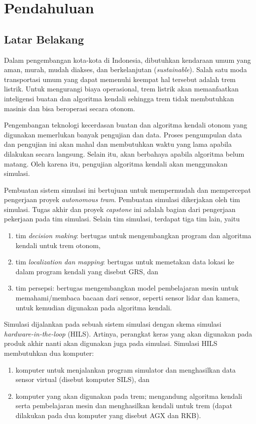 \chapter{Pendahuluan}\label{chapter-1}

\section{Latar Belakang}

Dalam pengembangan kota-kota di Indonesia, dibutuhkan kendaraan umum yang aman,
murah, mudah diakses, dan berkelanjutan (\textit{sustainable}). Salah satu moda
transportasi umum yang dapat memenuhi keempat hal tersebut adalah trem listrik.
Untuk mengurangi biaya operasional, trem listrik akan memanfaatkan inteligensi
buatan dan algoritma kendali sehingga trem tidak membutuhkan masinis dan bisa
beroperasi secara otonom.

Pengembangan teknologi kecerdasan buatan dan algoritma kendali otonom yang
digunakan memerlukan banyak pengujian dan data. Proses pengumpulan data dan
pengujian ini akan mahal dan membutuhkan waktu yang lama apabila dilakukan
secara langsung. Selain itu, akan berbahaya apabila algoritma belum matang. Oleh
karena itu, pengujian algoritma kendali akan menggunakan simulasi.

Pembuatan sistem simulasi ini bertujuan untuk mempermudah dan mempercepat
pengerjaan proyek \textit{autonomous tram}. Pembuatan simulasi dikerjakan oleh
tim simulasi. Tugas akhir dan proyek \textit{capstone} ini adalah bagian dari
pengerjaan pekerjaan pada tim simulasi. Selain tim simulasi, terdapat tiga tim
lain, yaitu
\begin{enumerate}
	\item tim \textit{decision making}: bertugas untuk mengembangkan program dan
	      algoritma kendali untuk trem otonom,
	\item tim \textit{localization dan mapping}: bertugas untuk memetakan data
	      lokasi ke dalam program kendali yang disebut GRS, dan
	\item tim persepsi: bertugas mengembangkan model pembelajaran mesin untuk
	      memahami/membaca bacaan dari sensor, seperti sensor lidar dan kamera,
	      untuk kemudian digunakan pada algoritma kendali.
\end{enumerate}

Simulasi dijalankan pada sebuah sistem simulasi dengan skema simulasi
\textit{hardware-in-the-loop} (HILS). Artinya, perangkat keras yang akan
digunakan pada produk akhir nanti akan digunakan juga pada simulasi. Simulasi
HILS membutuhkan dua komputer:
\begin{enumerate}
	\item komputer untuk menjalankan program simulator dan menghasilkan data
	      sensor virtual (disebut komputer SILS), dan
	\item komputer yang akan digunakan pada trem; mengandung algoritma
	      kendali serta pembelajaran mesin dan menghasilkan kendali untuk trem
	      (dapat dilakukan pada dua komputer yang disebut AGX dan RKB).
\end{enumerate}

